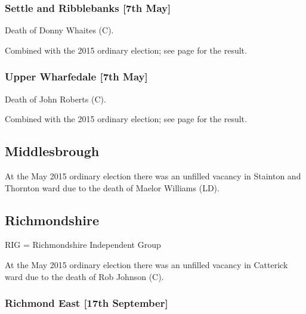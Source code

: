 \documentclass[a4paper,openany]{book}
\begin{document}
\begin{resultsiii}
\subsubsection*{Settle and Ribblebanks \hspace*{\fill}\nolinebreak[1]%
\enspace\hspace*{\fill}
[7th May]}


Death of Donny Whaites (C).

Combined with the 2015 ordinary election; see page \pageref{SettleRibblebanksCraven} for the result.

\subsubsection*{Upper Wharfedale \hspace*{\fill}\nolinebreak[1]%
\enspace\hspace*{\fill}
[7th May]}


Death of John Roberts (C).

Combined with the 2015 ordinary election; see page \pageref{UpperWharfedaleCraven} for the result.

\subsection*{Middlesbrough}

At the May 2015 ordinary election there was an unfilled vacancy in Stainton and Thornton ward due to the death of Maelor Williams (LD).

\subsection*{Richmondshire}

RIG = Richmondshire Independent Group

At the May 2015 ordinary election there was an unfilled vacancy in Catterick ward due to the death of Rob Johnson (C).

\subsubsection*{Richmond East \hspace*{\fill}\nolinebreak[1]%
\enspace\hspace*{\fill}
[17th September]}


\end{resultsiii}
\end{document}
